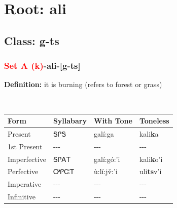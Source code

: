 \needspace{4in}
\section*{Root: ali}
\nopagebreak
{}
\needspace{3in}
\subsection*{Class: g-ts}
\nopagebreak
\needspace{2in}
\subsubsection*{\textcolor{Red}{Set A (k)}{-}\textbf{ali}{-}[g-ts]}
\nopagebreak
\textbf{Definition: } it is burning (refers to forest or grass)
\\[0.5em]
\begin{tabularx}{\textwidth}{l X X X}%
\toprule%
\textbf{Form}&\textbf{Syllabary}&\textbf{With Tone}&\textbf{Toneless}\\%
\midrule%
Present&ᎦᎵᎦ&galí:ga&kali\textbf{k}a\\%
1st Present&{-}{-}{-}&{-}{-}{-}&{-}{-}{-}\\%
Imperfective&ᎦᎵᎪᎢ&galí:gó:’i&kali\textbf{k}o'i\\%
Perfective&ᎤᎵᏨᎢ&ù:lí:jv̌:’i&uli\textbf{ts}v'i\\%
Imperative&{-}{-}{-}&{-}{-}{-}&{-}{-}{-}\\%
Infinitive&{-}{-}{-}&{-}{-}{-}&{-}{-}{-}\\%
\bottomrule%
\end{tabularx}
\\[1em]